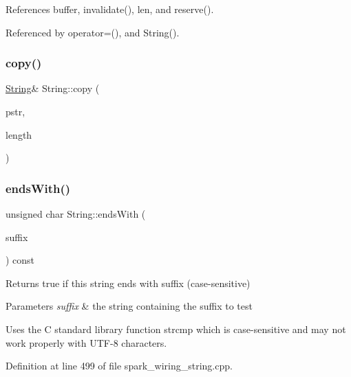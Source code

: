 References buffer, invalidate(), len, and reserve().



Referenced by operator=(), and String().

\mbox{\label{class_string_a8d349a2f3cf3c8cde32f8665660aec20}} 
\subsubsection{\texorpdfstring{copy()}{copy()}\hspace{0.1cm}{\footnotesize\ttfamily [2/2]}}
{\footnotesize\ttfamily \hyperlink{class_string}{String}\& String\+::copy (\begin{DoxyParamCaption}\item[{const \+\_\+\+\_\+\+Flash\+String\+Helper $\ast$}]{pstr,  }\item[{unsigned int}]{length }\end{DoxyParamCaption})\hspace{0.3cm}{\ttfamily [protected]}}

\mbox{\label{class_string_af96a205cd68121b2fbdf01f5e9b9bb31}} 
\subsubsection{\texorpdfstring{ends\+With()}{endsWith()}}
{\footnotesize\ttfamily unsigned char String\+::ends\+With (\begin{DoxyParamCaption}\item[{const \hyperlink{class_string}{String} \&}]{suffix }\end{DoxyParamCaption}) const}



Returns true if this string ends with suffix (case-\/sensitive) 


\begin{DoxyParams}{Parameters}
{\em suffix} & the string containing the suffix to test\\
\hline
\end{DoxyParams}
Uses the C standard library function strcmp which is case-\/sensitive and may not work properly with U\+T\+F-\/8 characters. 

Definition at line 499 of file spark\+\_\+wiring\+\_\+string.\+cpp.



